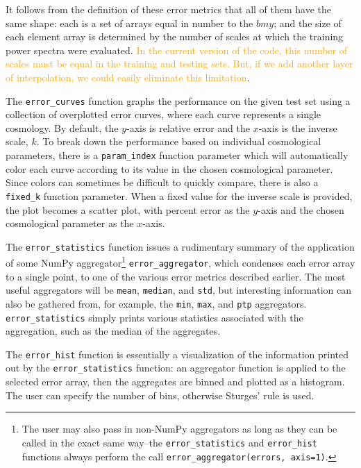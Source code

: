 It follows from the definition of these error metrics that all of them have 
the same shape: each is a set of arrays equal in number to the $bm{y}$; and 
the size of each element array is determined by the number of scales at which 
the training power spectra were evaluated. \textcolor{orange}{In the current
version of the code, this number of scales must be equal in the training and
testing sets. But, if we add another layer of interpolation, we could easily
eliminate this limitation}.

The \verb|error_curves| function graphs the performance on the given test set 
using a collection of overplotted error curves, where each curve represents a 
single cosmology. By default, the $y$-axis is relative error and the
$x$-axis is the inverse scale, $k$. To break down the performance based on 
individual cosmological parameters, there is a \verb|param_index| function
parameter which will automatically color each curve according to its value in 
the chosen cosmological parameter. Since colors can sometimes be difficult to 
quickly compare, there is also a \verb|fixed_k| function parameter. When a 
fixed value for the inverse scale is provided, the plot becomes a scatter 
plot, with percent error as the $y$-axis and the chosen cosmological parameter 
as the $x$-axis.


The \verb|error_statistics| function issues a rudimentary summary of the 
application of some NumPy aggregator\footnote{The user may also pass in
non-NumPy aggregators as long as they can be called in the exact same
way--the \verb|error_statistics| and \verb|error_hist| functions always
perform the call \verb|error_aggregator(errors, axis=1)|.}
\verb|error_aggregator|, which condenses each error array to a single point,
to one of the various error metrics described earlier. The 
most useful aggregators will be \verb|mean|, \verb|median|, and \verb|std|, 
but interesting information can also be gathered from, for example, the
\verb|min|, \verb|max|, and \verb|ptp| aggregators.
\verb|error_statistics| simply prints various statistics associated with the 
aggregation, such as the median of the aggregates.

The \verb|error_hist| function is essentially a visualization of the 
information printed out by the \verb|error_statistics| function: an aggregator
function is applied to the selected error array, then the aggregates are 
binned and plotted as a histogram. The user can specify the number of bins,
otherwise Sturges' rule is used.


